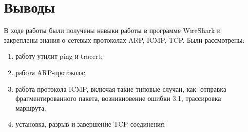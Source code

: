 \documentclass[a4paper, 14pt,russian]{article}
\begin{document}
\section{Выводы}
В ходе работы были получены навыки работы в программе WireShark и закреплены знания о сетевых протоколах ARP, ICMP, TCP. 
Были рассмотрены: 
\begin{enumerate}
	\item работу утилит ping и tracert;
	\item работа ARP-протокола;
	\item работа протокола ICMP, включая такие типовые случаи, как: отправка фрагментированного пакета, возникновение ошибки 3.1,  трассировка маршрута;
	\item установка, разрыв и завершение TCP соединения;
\end{enumerate}

\end{document}

